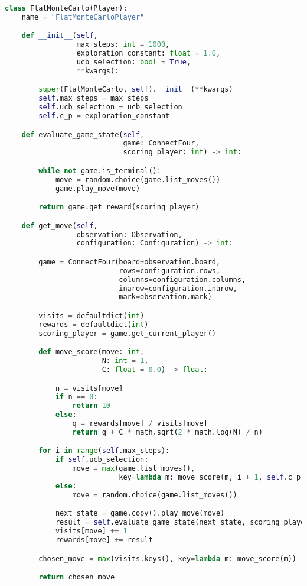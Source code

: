 \begin{lstlisting}[language=Python,caption=Flache Monte Carlo Suche.,label={lst:flat-mc}]
class FlatMonteCarlo(Player):
    name = "FlatMonteCarloPlayer"

    def __init__(self,
                 max_steps: int = 1000,
                 exploration_constant: float = 1.0,
                 ucb_selection: bool = True,
                 **kwargs):

        super(FlatMonteCarlo, self).__init__(**kwargs)
        self.max_steps = max_steps
        self.ucb_selection = ucb_selection
        self.c_p = exploration_constant

    def evaluate_game_state(self,
                            game: ConnectFour,
                            scoring_player: int) -> int:

        while not game.is_terminal():
            move = random.choice(game.list_moves())
            game.play_move(move)

        return game.get_reward(scoring_player)

    def get_move(self,
                 observation: Observation,
                 configuration: Configuration) -> int:

        game = ConnectFour(board=observation.board,
                           rows=configuration.rows,
                           columns=configuration.columns,
                           inarow=configuration.inarow,
                           mark=observation.mark)

        visits = defaultdict(int)
        rewards = defaultdict(int)
        scoring_player = game.get_current_player()

        def move_score(move: int,
                       N: int = 1,
                       C: float = 0.0) -> float:

            n = visits[move]
            if n == 0:
                return 10
            else:
                q = rewards[move] / visits[move]
                return q + C * math.sqrt(2 * math.log(N) / n)

        for i in range(self.max_steps):
            if self.ucb_selection:
                move = max(game.list_moves(),
                           key=lambda m: move_score(m, i + 1, self.c_p))
            else:
                move = random.choice(game.list_moves())

            next_state = game.copy().play_move(move)
            result = self.evaluate_game_state(next_state, scoring_player)
            visits[move] += 1
            rewards[move] += result

        chosen_move = max(visits.keys(), key=lambda m: move_score(m))

        return chosen_move
\end{lstlisting}

